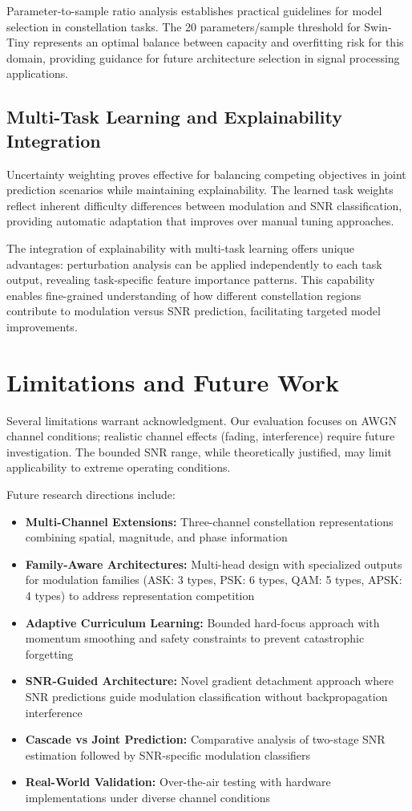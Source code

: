 \documentclass{ELSP}
\begin{document}
{{Parameter-to-sample ratio analysis establishes practical guidelines for model selection in constellation tasks. The 20 parameters/sample threshold for Swin-Tiny represents an optimal balance between capacity and overfitting risk for this domain, providing guidance for future architecture selection in signal processing applications.

\subsection{Multi-Task Learning and Explainability Integration}

Uncertainty weighting proves effective for balancing competing objectives in joint prediction scenarios while maintaining explainability. The learned task weights reflect inherent difficulty differences between modulation and SNR classification, providing automatic adaptation that improves over manual tuning approaches.

The integration of explainability with multi-task learning offers unique advantages: perturbation analysis can be applied independently to each task output, revealing task-specific feature importance patterns. This capability enables fine-grained understanding of how different constellation regions contribute to modulation versus SNR prediction, facilitating targeted model improvements.

\section{Limitations and Future Work}

Several limitations warrant acknowledgment. Our evaluation focuses on AWGN channel conditions; realistic channel effects (fading, interference) require future investigation. The bounded SNR range, while theoretically justified, may limit applicability to extreme operating conditions.

Future research directions include:
\begin{itemize}
    \item \textbf{Multi-Channel Extensions:} Three-channel constellation representations combining spatial, magnitude, and phase information
    \item \textbf{Family-Aware Architectures:} Multi-head design with specialized outputs for modulation families (ASK: 3 types, PSK: 6 types, QAM: 5 types, APSK: 4 types) to address representation competition
    \item \textbf{Adaptive Curriculum Learning:} Bounded hard-focus approach with momentum smoothing and safety constraints to prevent catastrophic forgetting
    \item \textbf{SNR-Guided Architecture:} Novel gradient detachment approach where SNR predictions guide modulation classification without backpropagation interference
    \item \textbf{Cascade vs Joint Prediction:} Comparative analysis of two-stage SNR estimation followed by SNR-specific modulation classifiers
    \item \textbf{Real-World Validation:} Over-the-air testing with hardware implementations under diverse channel conditions
\end{itemize}

}}
\end{document}
